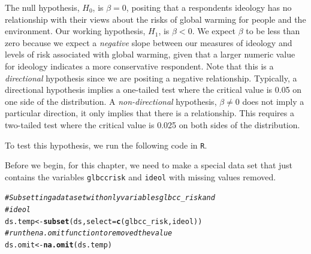 \documentclass[11pt,openany]{book}\usepackage[]{graphicx}\usepackage[]{color}
\makeatletter
\newcommand{\hlcom}[1]{\textcolor[rgb]{0.678,0.584,0.686}{\textit{#1}}}%
\newcommand{\hlstd}[1]{\textcolor[rgb]{0.345,0.345,0.345}{#1}}%
\newcommand{\hlkwb}[1]{\textcolor[rgb]{0.69,0.353,0.396}{#1}}%
\newcommand{\hlkwc}[1]{\textcolor[rgb]{0.333,0.667,0.333}{#1}}%
\newcommand{\hlkwd}[1]{\textcolor[rgb]{0.737,0.353,0.396}{\textbf{#1}}}%
\newenvironment{kframe}{%
 \def\at@end@of@kframe{}%
 \ifinner\ifhmode%
  \def\at@end@of@kframe{\end{minipage}}%
  \begin{minipage}{\columnwidth}%
 \fi\fi%
 \def\FrameCommand##1{\hskip\@totalleftmargin \hskip-\fboxsep
 \colorbox{shadecolor}{##1}\hskip-\fboxsep
     \hskip-\linewidth \hskip-\@totalleftmargin \hskip\columnwidth}%
 \MakeFramed {\advance\hsize-\width
   \@totalleftmargin\z@ \linewidth\hsize
   \@setminipage}}%
 {\par\unskip\endMakeFramed%
 \at@end@of@kframe}
\newenvironment{knitrout}{}{} %
\renewenvironment{knitrout}{\begin{singlespace}}{\end{singlespace}}
\makeatother
\begin{document}
The null hypothesis, $H_{0}$, is $\beta = 0$, positing that a respondents ideology has no relationship with their views about the risks of global warming for people and the environment. Our working hypothesis, $H_{1}$, is $\beta < 0$. We expect $\beta$ to be less than zero because we expect a \textit{negative} slope between our measures of ideology and levels of risk associated with global warming, given that a larger numeric value for ideology indicates a more conservative respondent. Note that this is a \textit{directional} hypothesis since we are positing a negative relationship. Typically, a directional hypothesis implies a one-tailed test where the critical value is 0.05 on one side of the distribution. A \textit{non-directional} hypothesis, $\beta \neq 0$ does not imply a particular direction, it only implies that there is a relationship. This requires a two-tailed test where the critical value is 0.025 on both sides of the distribution.  

To test this hypothesis, we run the following code in \texttt{R}. 

Before we begin, for this chapter, we need to make a special data set that just contains the variables \texttt{glbccrisk} and \texttt{ideol} with missing values removed.

\begin{knitrout}
\color{fgcolor}\begin{kframe}
\begin{alltt}
\hlcom{# Subsetting a data set with only variables glbcc_risk and}
\hlcom{# ideol}
\hlstd{ds.temp} \hlkwb{<-} \hlkwd{subset}\hlstd{(ds,} \hlkwc{select} \hlstd{=} \hlkwd{c}\hlstd{(glbcc_risk, ideol))}
\hlcom{# run the na.omit function to removed the value}
\hlstd{ds.omit} \hlkwb{<-} \hlkwd{na.omit}\hlstd{(ds.temp)}
\end{alltt}
\end{kframe}
\end{knitrout}
\end{document}
